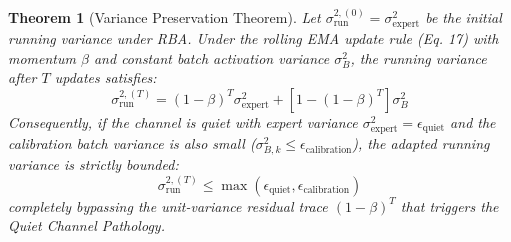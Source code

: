 \documentclass{article}
\newtheorem{theorem}{Theorem}
\begin{document}
\begin{theorem}[Variance Preservation Theorem]
\label{thm:variance_preservation}
Let $\sigma^{2,(0)}_{\text{run}} = \sigma^2_{\text{expert}}$ be the initial running variance under RBA. Under the rolling EMA update rule (Eq. 17) with momentum $\beta$ and constant batch activation variance $\sigma^2_B$, the running variance after $T$ updates satisfies:
\begin{equation}
  \sigma^{2,(T)}_{\text{run}} = (1 - \beta)^T \sigma^2_{\text{expert}} + \left[1 - (1 - \beta)^T \right] \sigma^2_B
\end{equation}
Consequently, if the channel is quiet with expert variance $\sigma^2_{\text{expert}} = \epsilon_{\text{quiet}}$ and the calibration batch variance is also small ($\sigma^2_{B,k} \leq \epsilon_{\text{calibration}}$), the adapted running variance is strictly bounded:
\begin{equation}
  \sigma^{2,(T)}_{\text{run}} \leq \max(\epsilon_{\text{quiet}}, \epsilon_{\text{calibration}})
\end{equation}
completely bypassing the unit-variance residual trace $(1 - \beta)^T$ that triggers the Quiet Channel Pathology.
\end{theorem}
\end{document}
